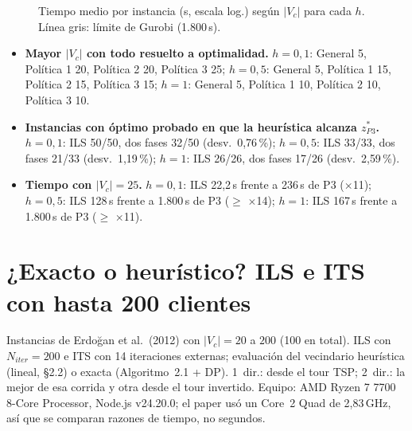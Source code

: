 \documentclass[11pt,a4paper]{article}
\begin{document}
\begin{figure}[!t]

\smallskip
{}
\caption{Tiempo medio por instancia (s, escala log.) según $|V_c|$ para cada $h$. Línea gris: límite de Gurobi (1.800\,s).}
\label{fig:tiempos}
\end{figure}

\FloatBarrier
\begin{itemize}
  \item \textbf{Mayor $|V_c|$ con todo resuelto a optimalidad.} $h = 0{,}1$: General 5, Política 1 20, Política 2 20, Política 3 25; $h = 0{,}5$: General 5, Política 1 15, Política 2 15, Política 3 15; $h = 1$: General 5, Política 1 10, Política 2 10, Política 3 10.
  \item \textbf{Instancias con óptimo probado en que la heurística alcanza $z^{*}_{P3}$.} $h = 0{,}1$: ILS 50/50, dos fases 32/50 (desv.\ 0{,}76\,\%); $h = 0{,}5$: ILS 33/33, dos fases 21/33 (desv.\ 1{,}19\,\%); $h = 1$: ILS 26/26, dos fases 17/26 (desv.\ 2{,}59\,\%).
  \item \textbf{Tiempo con $|V_c| = 25$.} $h = 0{,}1$: ILS 22{,}2\,s frente a 236\,s de P3 ($\times$11); $h = 0{,}5$: ILS 128\,s frente a 1.800\,s de P3 ($\geq$ $\times$14); $h = 1$: ILS 167\,s frente a 1.800\,s de P3 ($\geq$ $\times$11).
\end{itemize}

\section{¿Exacto o heurístico? ILS e ITS con hasta 200 clientes}
\label{sec:metaheuristicas}

Instancias de Erdo\u{g}an et al.~(2012) con $|V_c| = 20$ a $200$ (100 en total). ILS con $N_{iter} = 200$ e ITS con 14 iteraciones externas; evaluación del vecindario heurística (lineal, \S2.2) o exacta (Algoritmo~2.1 + DP). 1~dir.: desde el tour TSP; 2~dir.: la mejor de esa corrida y otra desde el tour invertido. Equipo: AMD Ryzen 7 7700 8-Core Processor, Node.js v24.20.0; el paper usó un Core~2 Quad de 2{,}83\,GHz, así que se comparan razones de tiempo, no segundos.
\end{document}

